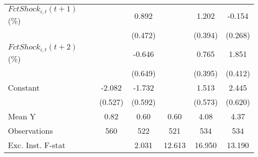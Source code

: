 {\begin{tabular}{l*{5}{c}}
\addlinespace
$ FctShock_{i,t}(t+1)$ (\%)&                     &       0.892\sym{*}  &                     &       1.202\sym{***}&      -0.154         \\
                    &                     &     (0.472)         &                     &     (0.394)         &     (0.268)         \\
\addlinespace
$ FctShock_{i,t}(t+2)$ (\%)&                     &      -0.646         &                     &       0.765\sym{*}  &       1.851\sym{***}\\
                    &                     &     (0.649)         &                     &     (0.395)         &     (0.412)         \\
\addlinespace
Constant            &      -2.082\sym{***}&      -1.732\sym{***}&                     &       1.513\sym{**} &       2.445\sym{***}\\
                    &     (0.527)         &     (0.592)         &                     &     (0.573)         &     (0.620)         \\
\midrule
Mean Y              &        0.82         &        0.60         &        0.60         &        4.08         &        4.37         \\
Observations        &         560         &         522         &         521         &         534         &         534         \\
Exc. Inst. F-stat   &                     &       2.031         &      12.613         &      16.950         &      13.190         \\
\bottomrule
\end{tabular}
}
